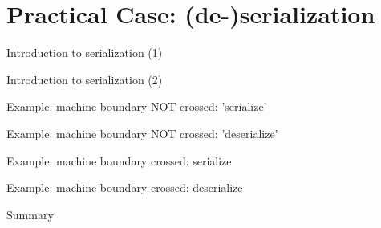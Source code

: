 \section{Practical Case: (de-)serialization}

\begin{frame}{Introduction to serialization (1)}
\end{frame}

\begin{frame}{Introduction to serialization (2)}
\end{frame}

\begin{frame}{Example: machine boundary NOT crossed: 'serialize'}
\end{frame}

\begin{frame}{Example: machine boundary NOT crossed: 'deserialize'}
\end{frame}

\begin{frame}{Example: machine boundary crossed: serialize}
\end{frame}

\begin{frame}{Example: machine boundary crossed: deserialize}
\end{frame}

\begin{frame}{Summary}
\end{frame}
